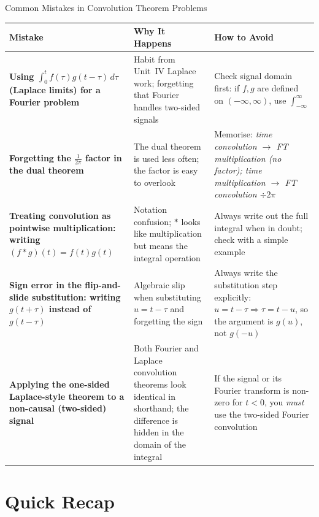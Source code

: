 \documentclass[12pt,a4paper]{article}
\begin{document}
\begin{mistakebox}{Common Mistakes in Convolution Theorem Problems}
\begin{center}
\begin{tabular}{>{\bfseries}p{5cm} p{4.5cm} p{4.5cm}}
\toprule
Mistake & Why It Happens & How to Avoid \\
\midrule
Using $\int_0^t f(\tau)g(t-\tau)\,d\tau$ (Laplace limits) for a Fourier problem &
  Habit from Unit~IV Laplace work; forgetting that Fourier handles two-sided signals &
  Check signal domain first: if $f,g$ are defined on $(-\infty,\infty)$, use
  $\int_{-\infty}^{\infty}$ \\[6pt]
Forgetting the $\frac{1}{2\pi}$ factor in the dual theorem &
  The dual theorem is used less often; the factor is easy to overlook &
  Memorise: \emph{time convolution $\to$ FT multiplication (no factor); time
  multiplication $\to$ FT convolution $\div 2\pi$} \\[6pt]
Treating convolution as pointwise multiplication: writing $(f*g)(t)=f(t)g(t)$ &
  Notation confusion; $*$ looks like multiplication but means the integral operation &
  Always write out the full integral when in doubt; check with a simple example \\[6pt]
Sign error in the flip-and-slide substitution: writing $g(t+\tau)$ instead of $g(t-\tau)$ &
  Algebraic slip when substituting $u=t-\tau$ and forgetting the sign &
  Always write the substitution step explicitly:
  $u = t-\tau \Rightarrow \tau = t-u$, so the argument is $g(u)$, not $g(-u)$ \\[6pt]
Applying the one-sided Laplace-style theorem to a non-causal (two-sided) signal &
  Both Fourier and Laplace convolution theorems look identical in shorthand;
  the difference is hidden in the domain of the integral &
  If the signal or its Fourier transform is non-zero for $t<0$, you \emph{must}
  use the two-sided Fourier convolution \\
\bottomrule
\end{tabular}
\end{center}
\end{mistakebox}

\section{Quick Recap}
\end{document}

